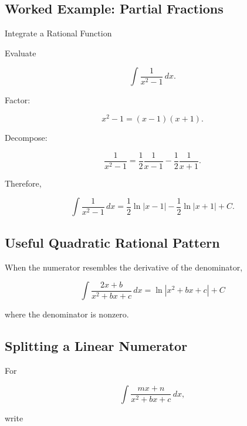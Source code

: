 \subsection{Worked Example: Partial Fractions}
\label{subsec:worked-partial-fractions}

\begin{workedexamplebox}{Integrate a Rational Function}

Evaluate

\[
\int
\frac{
1
}{
x^2-1
}
\,dx.
\]

Factor:

\[
x^2-1
=
(x-1)(x+1).
\]

Decompose:

\[
\frac{
1
}{
x^2-1
}
=
\frac12
\frac1{x-1}
-
\frac12
\frac1{x+1}.
\]

Therefore,

\begin{answerbox}
\[
\boxed{
\int
\frac{
1
}{
x^2-1
}
\,dx
=
\frac12
\ln|x-1|
-
\frac12
\ln|x+1|
+
C.
}
\]
\end{answerbox}

\end{workedexamplebox}

\subsection{Useful Quadratic Rational Pattern}
\label{subsec:quadratic-rational-pattern}

When the numerator resembles the derivative of the denominator,

\[
\boxed{
\int
\frac{
2x+b
}{
x^2+bx+c
}
\,dx
=
\ln
|x^2+bx+c|
+
C
}
\]

where the denominator is nonzero.

\subsection{Splitting a Linear Numerator}
\label{subsec:splitting-linear-numerator}

For

\[
\int
\frac{
mx+n
}{
x^2+bx+c
}
\,dx,
\]

write

